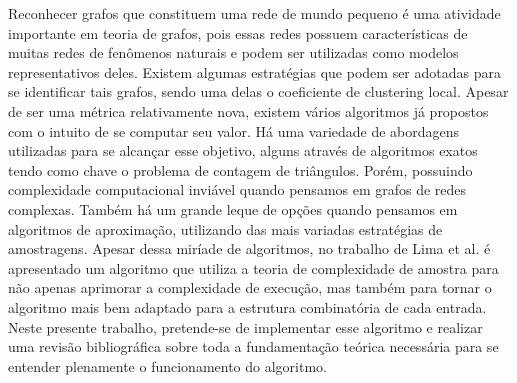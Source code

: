 
\begin{resumoutfpr}%
Reconhecer grafos que constituem uma rede de mundo pequeno é uma atividade importante
em teoria de grafos, pois essas redes possuem características de muitas redes de fenômenos
naturais e podem ser utilizadas como modelos representativos deles. Existem algumas
estratégias que podem ser adotadas para se identificar tais grafos, sendo uma delas o
coeficiente de clustering local. Apesar de ser uma métrica relativamente nova, existem vários
algoritmos já propostos com o intuito de se computar seu valor. Há uma variedade de
abordagens utilizadas para se alcançar esse objetivo, alguns através de algoritmos exatos tendo
como chave o problema de contagem de triângulos. Porém, possuindo complexidade
computacional inviável quando pensamos em grafos de redes complexas. Também há um
grande leque de opções quando pensamos em algoritmos de aproximação, utilizando das mais
variadas estratégias de amostragens. Apesar dessa miríade de algoritmos, no trabalho de Lima
et al. \cite{Lima2022} é apresentado um algoritmo que utiliza a teoria de complexidade de amostra para
não apenas aprimorar a complexidade de execução, mas também para tornar o algoritmo mais
bem adaptado para a estrutura combinatória de cada entrada. Neste presente trabalho,
pretende-se de implementar esse algoritmo e realizar uma revisão bibliográfica sobre toda a
fundamentação teórica necessária para se entender plenamente o funcionamento do algoritmo.
\end{resumoutfpr}
